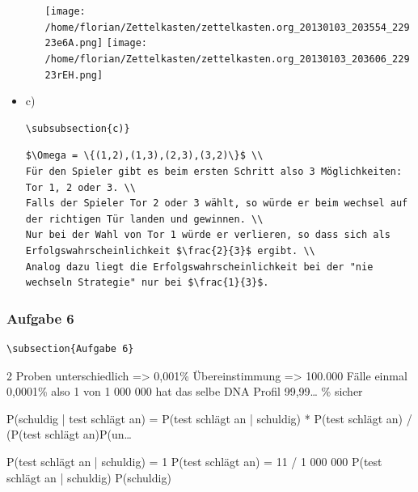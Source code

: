 \documentclass[11pt]{article}
\begin{document}
\begin{itemize}
\begin{itemize}
\texttt{[image: /home/florian/Zettelkasten/zettelkasten.org\_20130103\_203554\_22923e6A.png]}
\texttt{[image: /home/florian/Zettelkasten/zettelkasten.org\_20130103\_203606\_22923rEH.png]}
\end{itemize} %

\item c)\\
\label{sec-3-8-6-3}%
\begin{verbatim}
\subsubsection{c)}
\end{verbatim}


\begin{verbatim}
$\Omega = \{(1,2),(1,3),(2,3),(3,2)\}$ \\
Für den Spieler gibt es beim ersten Schritt also 3 Möglichkeiten: Tor 1, 2 oder 3. \\ 
Falls der Spieler Tor 2 oder 3 wählt, so würde er beim wechsel auf der richtigen Tür landen und gewinnen. \\
Nur bei der Wahl von Tor 1 würde er verlieren, so dass sich als Erfolgswahrscheinlichkeit $\frac{2}{3}$ ergibt. \\
Analog dazu liegt die Erfolgswahrscheinlichkeit bei der "nie wechseln Strategie" nur bei $\frac{1}{3}$.
\end{verbatim}
\end{itemize} %
\subsubsection{Aufgabe 6}
\label{sec-3-8-7}


\begin{verbatim}
\subsection{Aufgabe 6}
\end{verbatim}

2 Proben unterschiedlich => 0,001\% Übereinstimmung => 100.000 Fälle einmal
0,0001\% also 1 von 1 000 000 hat das selbe DNA Profil
99,99\ldots{} \% sicher

P(schuldig | test schlägt an) = P(test schlägt an | schuldig) * P(test schlägt an) / (P(test schlägt an)P(un\ldots{}

P(test schlägt an | schuldig) = 1
P(test schlägt an) = 11 / 1 000 000
P(test schlägt an | schuldig) P(schuldig) 
\end{document}
